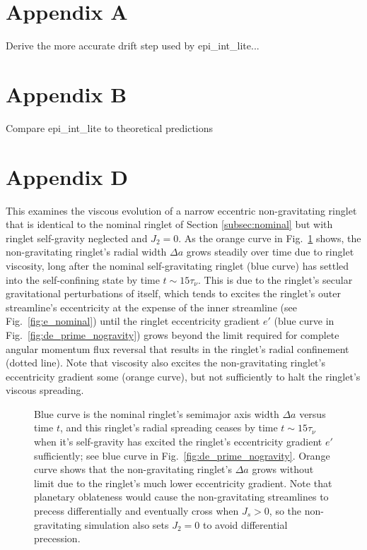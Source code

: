 \documentclass[preprint]{aastex62}
\begin{document}
\section{Appendix A}
\label{sec:Appendix A}

Derive the more accurate drift step used by epi\_int\_lite...

\section{Appendix B}
\label{sec:Appendix B}

Compare epi\_int\_lite to theoretical predictions

\section{Appendix D}
\label{sec:Appendix D}

This examines the viscous evolution of a narrow eccentric non-gravitating
ringlet that is identical to the nominal ringlet of Section \ref{subsec:nominal} but
with ringlet self-gravity neglected and $J_2=0$.
As the orange curve in Fig.\ \ref{fig:da_nogravity} shows, the non-gravitating ringlet's
radial width $\Delta a$ grows steadily over time due to ringlet viscosity, 
long after the nominal self-gravitating ringlet (blue curve)
has settled into the self-confining state by time $t\sim15\tau_\nu$. This is due to the
ringlet's secular gravitational perturbations of itself,
which tends to excites the ringlet's outer streamline's eccentricity at the expense
of the inner streamline (see Fig.\ \ref{fig:e_nominal}) until the ringlet eccentricity gradient $e'$
(blue curve in Fig.\ \ref{fig:de_prime_nogravity}) grows beyond the
limit required for complete angular momentum flux reversal 
that results in the ringlet's radial confinement (dotted line). 
Note that viscosity also excites the non-gravitating
ringlet's eccentricity gradient some (orange curve), but not sufficiently to halt the ringlet's 
viscous spreading.

\begin{figure}
    \caption{
        \label{fig:da_nogravity}
        Blue curve is the nominal ringlet's semimajor axis width $\Delta a$ versus time $t$,
        and this ringlet's radial spreading ceases by time $t\sim15\tau_\nu$ when it's self-gravity
        has excited the ringlet's eccentricity gradient $e'$ sufficiently; 
        see blue curve in Fig.\ \ref{fig:de_prime_nogravity}. Orange curve shows that
        the non-gravitating ringlet's $\Delta a$ grows without limit due to the ringlet's
        much lower eccentricity gradient. Note that planetary oblateness would
        cause the non-gravitating streamlines to precess differentially and eventually cross
        when $J_s>0$, so the non-gravitating simulation also sets $J_2=0$ 
        to avoid differential precession.
    }
\end{figure}
\end{document}
